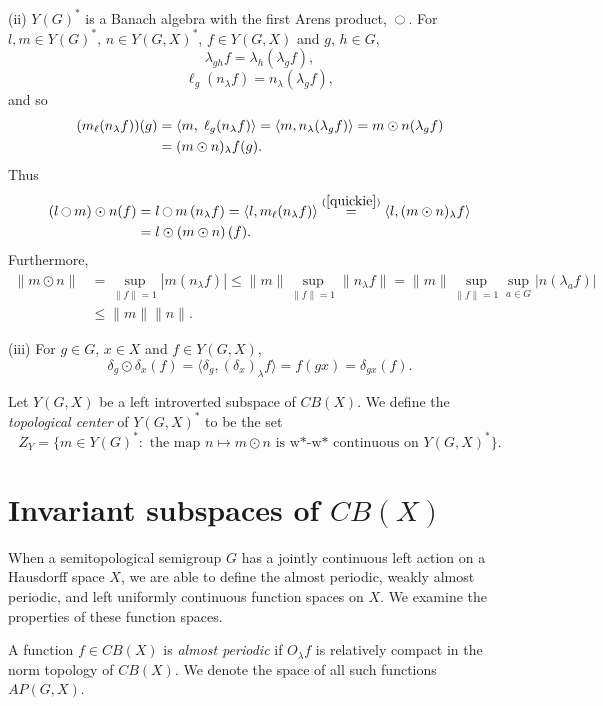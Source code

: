 (ii) $Y(G)^*$ is a Banach algebra with the first Arens product, $\oodot$.
For $l,m \in Y(G)^*$, $n\in Y(G,X)^*$, $f\in Y(G,X)$ and $g$, $h\in G$,
\[
\lambda_{gh}f = \lambda_h(\lambda_g f),
\]
\[
\ell_g(n_\lambda f) = n_\lambda(\lambda_g f),
\]
and so
\begin{align}\label{quickie}
(m_\ell (n_\lambda f))(g) &= \langle m,\;\ell_g(n_\lambda f)\rangle = \langle m,n_\lambda (\lambda_g f)\rangle
= m\odot n(\lambda_g f)\\
&= (m\odot n)_\lambda f(g). \notag
\end{align}
Thus
\begin{align*}
\left(l \oodot m\right)\odot n(f) &= l\oodot m\,(n_\lambda f) = \langle l, m_\ell (n_\lambda f)\rangle
\stackrel{(\ref{quickie})}{=} \langle l, (m\odot n)_\lambda f\rangle \\
&= l \odot \left( m \odot n\right)(f).
\end{align*}
Furthermore,
\begin{align*}
\|m\odot n\| &= \sup_{ \| f \| =1}|m(n_\lambda f)| \leq \|m\| \sup_{ \| f \| =1} \|n_\lambda f\|
= \|m\| \sup_{ \| f \| =1} \sup_{a\in G} |n(\lambda_a f)| \\ &\leq \|m\| \|n\|.
\end{align*}

(iii) For $g\in G$, $x\in X$ and $f\in Y(G,X)$,
\[
\delta_g\odot\delta_x(f) = \langle\delta_g, (\delta_x)_\lambda f\rangle = f(gx) = \delta_{gx}(f).
\]
\done

\begin{defn}
Let $Y(G,X)$ be a left introverted subspace of $CB(X)$.
We define the {\it topological center} of $Y(G,X)^*$ to be the set
\[
Z_Y = \{m\in Y(G)^*:\text{ the map }n\mapsto m\odot n\text{ is w*-w* continuous on }Y(G,X)^*\}.
\]
\end{defn}

\section{Invariant subspaces of $CB(X)$}\label{subspaces}
When a semitopological semigroup $G$ has a jointly continuous left action on
a Hausdorff space $X$, we are able to define the almost periodic, weakly almost
periodic, and left uniformly continuous function spaces on $X$.  We examine
the properties of these function spaces.

\begin{defn}
A function $f\in CB(X)$ is {\it almost periodic} 
if $O_\lambda f$ is relatively compact in the norm topology of $CB(X)$.  We
denote the space of all such functions $AP(G,X)$.
\end{defn}

